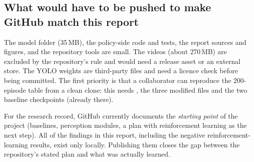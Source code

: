 \subsection{What would have to be pushed to make GitHub match this report}
The model folder (35\,MB), the policy-side code and tests, the report sources and figures, and the repository tools are small. The videos (about 270\,MB) are excluded by the repository's  rule and would need a release asset or an external store. The YOLO weights are third-party files and need a licence check before being committed.
The first priority is that a collaborator can reproduce the 200-episode table from a clean clone: this needs , the three modified  files and the two baseline checkpoints (already there).
\begin{implicationbox}
For the research record, GitHub currently documents the \emph{starting point} of the project (baselines, perception modules, a plan with reinforcement learning as the next step). All of the findings in this report, including the negative reinforcement-learning results, exist only locally. Publishing them closes the gap between the repository's stated plan and what was actually learned.
\end{implicationbox}
